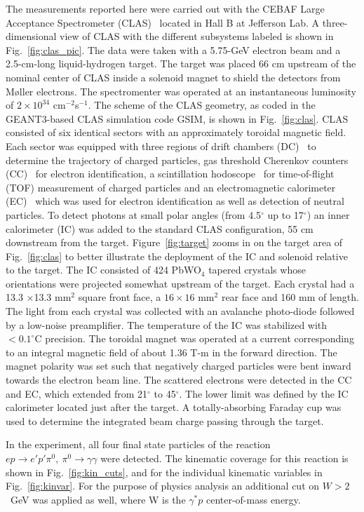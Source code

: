 \documentclass[prc,floatfix,twocolumn,superscriptaddress,letter]{revtex4}
\begin{document}
The measurements reported here were carried out with the CEBAF Large Acceptance Spectrometer (CLAS)~\cite{clas-detector} located in Hall B at Jefferson Lab. A three-dimensional view of  CLAS  with the different subsystems labeled is shown in Fig.~\ref{fig:clas_pic}.  
The data were taken with a 5.75-GeV electron beam and a 2.5-cm-long liquid-hydrogen target.
The target was placed 66 cm upstream of the nominal center of CLAS inside a solenoid magnet to shield the detectors from 
M{\o}ller electrons.
The spectromenter was operated at an instantaneous luminosity of $2\times10^{34}$ cm$^{-2}$s$^{-1}$.
The scheme of the CLAS geometry, as coded in the GEANT3-based CLAS simulation code GSIM,
is shown in Fig.~\ref{fig:clas}.
CLAS  consisted  of six identical sectors with an approximately toroidal magnetic field. Each sector was equipped with three regions of drift chambers (DC)~\cite{DC}
to determine the trajectory of charged particles, gas threshold Cherenkov counters (CC)~\cite{CC} 
for electron identification, a scintillation hodoscope~\cite{SC}  for time-of-flight (TOF) measurement of charged particles and an electromagnetic calorimeter (EC)~\cite{EC}  which was used for electron identification as well as detection of neutral particles. 
To detect photons at small polar angles (from 4.5$^\circ$ up to 17$^\circ$) an inner calorimeter (IC) was added to the standard CLAS configuration, 55 cm downstream from the target. Figure~\ref{fig:target} zooms in on the target area of Fig.~\ref{fig:clas} to better illustrate the deployment of the IC and solenoid relative to the target.
The IC  consisted of 424 PbWO$_4$ tapered crystals whose orientations were projected somewhat upstream of the target. Each crystal had a 13.3 $\times$13.3 mm$^2$ square front face, a $16 \times16$ mm$^2$  rear face and 160 mm of length.
The light from each crystal was collected with an avalanche photo-diode followed by a low-noise preamplifier. The temperature of the IC was stabilized with $<0.1^\circ$C precision. 
The toroidal magnet was operated at a current
corresponding to an integral magnetic field of about 1.36 T-m in the forward direction.
 The magnet polarity was set such that negatively charged particles were bent inward towards the electron beam line. The 
scattered electrons were detected in the CC and EC, which extended from 21$^\circ$ to 45$^\circ$. The lower limit was defined by the IC calorimeter located just after the target.
A totally-absorbing Faraday cup was used to determine the integrated beam charge passing through the target.

In the experiment, all four final state particles of the reaction $ep \to e' p' \pi^0,\  \pi^0 \to \gamma\gamma$ were detected. 
The kinematic coverage for this reaction is shown in Fig.~\ref{fig:kin_cuts},  and for the individual kinematic variables in Fig.~\ref{fig:kinvar}. For the purpose of physics analysis an additional cut on  $W>2$~GeV was applied as well, where W is the $\gamma^*p$ center-of-mass energy.
\end{document}
